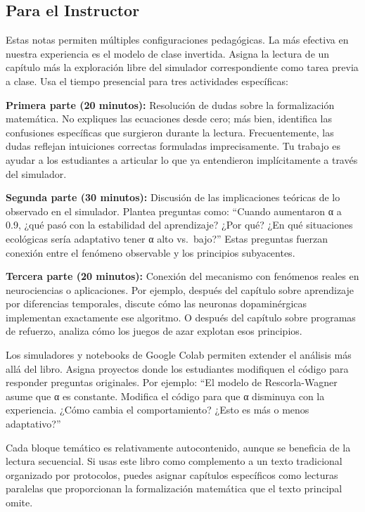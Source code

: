 \documentclass[
  letterpaper,
  DIV=11,
  numbers=noendperiod]{scrreprt}
\begin{document}
\subsection{Para el Instructor}\label{para-el-instructor}

Estas notas permiten múltiples configuraciones pedagógicas. La más
efectiva en nuestra experiencia es el modelo de clase invertida. Asigna
la lectura de un capítulo más la exploración libre del simulador
correspondiente como tarea previa a clase. Usa el tiempo presencial para
tres actividades específicas:

\textbf{Primera parte (20 minutos):} Resolución de dudas sobre la
formalización matemática. No expliques las ecuaciones desde cero; más
bien, identifica las confusiones específicas que surgieron durante la
lectura. Frecuentemente, las dudas reflejan intuiciones correctas
formuladas imprecisamente. Tu trabajo es ayudar a los estudiantes a
articular lo que ya entendieron implícitamente a través del simulador.

\textbf{Segunda parte (30 minutos):} Discusión de las implicaciones
teóricas de lo observado en el simulador. Plantea preguntas como:
``Cuando aumentaron α a 0.9, ¿qué pasó con la estabilidad del
aprendizaje? ¿Por qué? ¿En qué situaciones ecológicas sería adaptativo
tener α alto vs.~bajo?'' Estas preguntas fuerzan conexión entre el
fenómeno observable y los principios subyacentes.

\textbf{Tercera parte (20 minutos):} Conexión del mecanismo con
fenómenos reales en neurociencias o aplicaciones. Por ejemplo, después
del capítulo sobre aprendizaje por diferencias temporales, discute cómo
las neuronas dopaminérgicas implementan exactamente ese algoritmo. O
después del capítulo sobre programas de refuerzo, analiza cómo los
juegos de azar explotan esos principios.

Los simuladores y notebooks de Google Colab permiten extender el
análisis más allá del libro. Asigna proyectos donde los estudiantes
modifiquen el código para responder preguntas originales. Por ejemplo:
``El modelo de Rescorla-Wagner asume que α es constante. Modifica el
código para que α disminuya con la experiencia. ¿Cómo cambia el
comportamiento? ¿Esto es más o menos adaptativo?''

Cada bloque temático es relativamente autocontenido, aunque se beneficia
de la lectura secuencial. Si usas este libro como complemento a un texto
tradicional organizado por protocolos, puedes asignar capítulos
específicos como lecturas paralelas que proporcionan la formalización
matemática que el texto principal omite.
\end{document}
